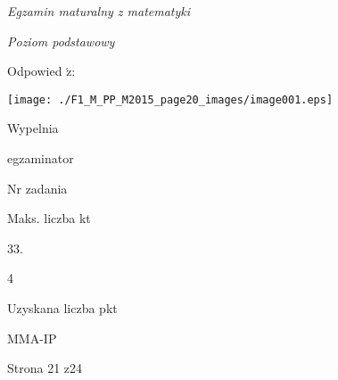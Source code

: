 \documentclass[a4paper,12pt]{article}
\begin{document}
{\it Egzamin maturalny z matematyki}

{\it Poziom podstawowy}

Odpowied $\acute{\mathrm{z}}$:
\begin{center}
\texttt{[image: ./F1\_M\_PP\_M2015\_page20\_images/image001.eps]}
\end{center}
Wypelnia

egzaminator

Nr zadania

Maks. liczba kt

33.

4

Uzyskana liczba pkt

MMA-IP

Strona 21 z24
\end{document}
